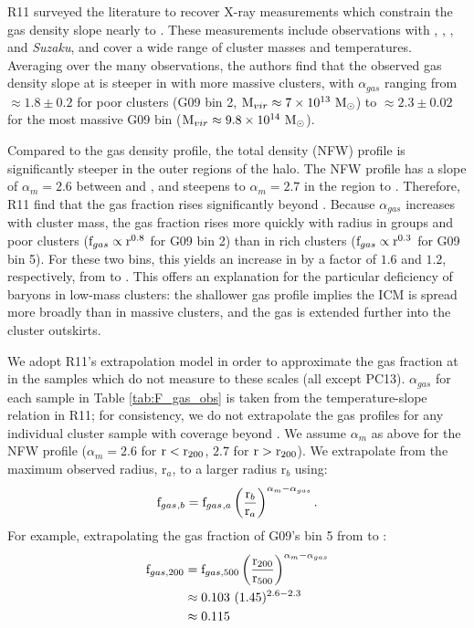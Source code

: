 R11 surveyed the literature to recover X-ray measurements which
constrain the gas density slope nearly to \rvir{}. These measurements
include observations with \Rosat{}, \Chandra, \XMM, and
\textit{Suzaku}, and cover a wide range of cluster masses and
temperatures. Averaging over the many observations, the authors find
that the observed gas density slope at \rfive{} is steeper in with
more massive clusters, with $\alpha_{gas}$ ranging from $\approx 1.8
\pm 0.2$ for poor clusters (G09 bin 2, $\textrm{M\ensuremath{_{vir}}} \approx
7\times 10^{13}~\textrm{M}_\odot$) to $\approx 2.3 \pm 0.02$ for the most massive G09
bin ($\textrm{M\ensuremath{_{vir}}} \approx9.8\times 10^{14}~\textrm{M}_\odot$).

Compared to the gas density profile, the total density (NFW) profile
is significantly steeper in the outer regions of the halo. The NFW
profile has a slope of $\alpha_m = 2.6$ between \rfive{} and \rtwo{},
and steepens to $\alpha_m = 2.7$ in the region \rtwo{} to
\rvir{}. Therefore, R11 find that the gas fraction rises significantly
beyond \rfive{}. Because $\alpha_{gas}$ increases with cluster mass,
the gas fraction rises more quickly with radius in groups and poor
clusters ($\textrm{f\ensuremath{_{gas}}}\propto \textrm{r}^{0.8}$ for G09 bin 2) than in rich
clusters ($\textrm{f\ensuremath{_{gas}}} \propto \textrm{r}^{0.3}$ for G09 bin 5). For these two
bins, this yields an increase in \fg{} by a factor of $1.6$ and $1.2$,
respectively, from \rfive{} to \rvir{}. This offers an explanation for
the particular deficiency of baryons in low-mass clusters: the
shallower gas profile implies the ICM is spread more broadly than in
massive clusters, and the gas is extended further into the cluster
outskirts.

We adopt R11's extrapolation model in order to approximate the gas
fraction at \rvir{} in the samples which do not measure \fg{} to
these scales (all except PC13). $\alpha_{gas}$ for each sample in Table
\ref{tab:F_gas_obs} is taken from the temperature-slope relation in
R11; for consistency, we do not extrapolate the gas profiles for any
individual cluster sample with coverage beyond \rfive{}. We assume
$\alpha_m$ as above for the NFW profile ($\alpha_m = 2.6$ for
$\textrm{r}<\textrm{r\ensuremath{_{200}}}$, $2.7$ for $\textrm{r}>\textrm{r\ensuremath{_{200}}}$). We extrapolate \fg{} from the
maximum observed radius, r$_a$, to a larger radius r$_b$ using:
\begin{equation}
\textrm{f\ensuremath{_{gas}}}{}_{,b} =
\textrm{f\ensuremath{_{gas}}}{}_{,a}\left(\frac{\textrm{r}_b}{\textrm{r}_a}\right)^{\alpha_m - \alpha_{gas}}.
\end{equation}
 For example, extrapolating the gas fraction of G09's bin 5 from \rfive{} to \rtwo{}:
\begin{align}
\textrm{f\ensuremath{_{gas,200}}} &= \textrm{f\ensuremath{_{gas,500}}}\left(\frac{\textrm{r\ensuremath{_{200}}}}{\textrm{r\ensuremath{_{500}}}}\right)^{\alpha_m -
  \alpha_{gas}} \\ &\approx 0.103~(1.45)^{2.6 - 2.3} \nonumber
\\ &\approx 0.115 \nonumber
\end{align}

